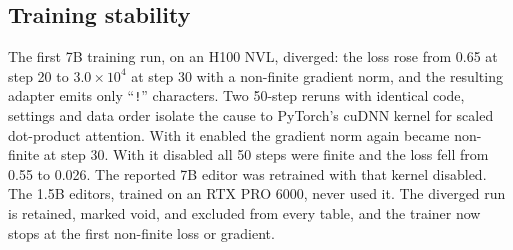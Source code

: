 \subsection{Training stability}
The first 7B training run, on an H100 NVL, diverged: the loss rose from 0.65 at step 20 to $3.0{\times}10^{4}$
at step 30 with a non-finite gradient norm, and the resulting adapter emits only ``\texttt{!}'' characters. Two
50-step reruns with identical code, settings and data order isolate the cause to PyTorch's cuDNN kernel for
scaled dot-product attention. With it enabled the gradient norm again became non-finite at step 30. With it disabled
all 50 steps were finite and the loss fell from 0.55 to 0.026. The reported 7B editor was retrained with that kernel
disabled. The 1.5B editors, trained on an RTX PRO 6000, never used it. The diverged run is retained,
marked void, and excluded from every table, and the trainer now stops at the first non-finite loss or gradient.
